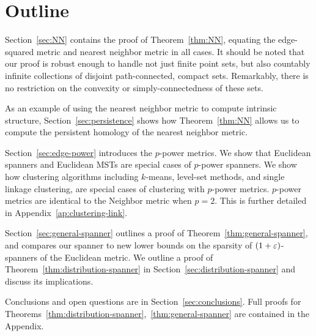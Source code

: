 \section{Outline}
%
Section~\ref{sec:NN} contains the proof of Theorem~\ref{thm:NN},
equating the edge-squared metric and nearest neighbor metric in
all cases. It should be noted that our proof is robust enough to handle not
just finite point sets, but also countably infinite collections of disjoint
path-connected, compact sets. Remarkably, there is no restriction on the convexity or
simply-connectedness of these sets.

As an example of using the nearest neighbor metric to compute intrinsic structure, Section~\ref{sec:persistence} shows how Theorem~\ref{thm:NN} allows us to compute the persistent homology of the nearest neighbor metric.

Section~\ref{sec:edge-power} introduces the $p$-power metrics. We show
that Euclidean spanners and Euclidean MSTs are special cases of
$p$-power spanners. We show how
clustering algorithms including $k$-means, level-set methods,
and single linkage clustering, are special cases of
clustering with $p$-power metrics. $p$-power metrics are identical to the
Neighbor metric when $p=2$. This is further detailed in
Appendix~\ref{ap:clustering-link}.

Section~\ref{sec:general-spanner} outlines a proof of
Theorem~\ref{thm:general-spanner}, and compares our spanner to new lower
bounds on the sparsity of $(1+\varepsilon)$-spanners of the Euclidean metric.  We
outline a proof of Theorem~\ref{thm:distribution-spanner} in
Section~\ref{sec:distribution-spanner} and discuss its implications.


Conclusions and open questions are in
Section~\ref{sec:conclusions}. Full proofs for
Theorems~\ref{thm:distribution-spanner},~\ref{thm:general-spanner}
are contained in the Appendix.

